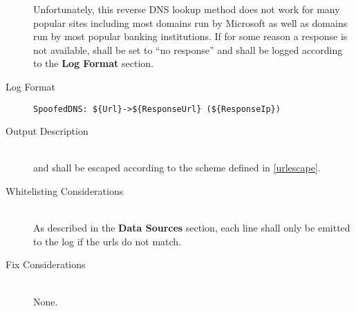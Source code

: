 \begin{description}
Unfortunately, this reverse DNS lookup method does not work for many popular
sites including most domains run by Microsoft as well as domains run by most
popular banking institutions.  If for some reason a response is not available,
 shall be set to ``no response'' and shall be logged according
to the \textbf{Log Format} section.
\item[Log Format] \hfill
\vspace{-\baselineskip}
\begin{verbatim}
SpoofedDNS: ${Url}->${ResponseUrl} (${ResponseIp})
\end{verbatim}
\item[Output Description] \hfill \\
 and  shall be escaped according to the
scheme defined in \ref{urlescape}.
\item[Whitelisting Considerations] \hfill \\
As described in the \textbf{Data Sources} section, each line shall only be
emitted to the log if the urls do not match.
\item[Fix Considerations] \hfill \\
None.
\end{description}

